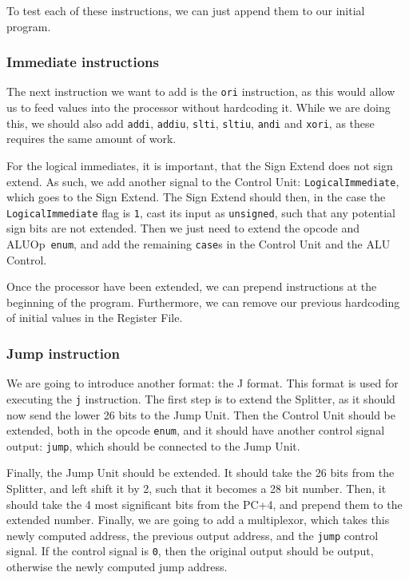 To test each of these instructions, we can just append them to our initial
program.

\subsubsection*{Immediate instructions}
The next instruction we want to add is the \texttt{ori} instruction, as this
would allow us to feed values into the processor without hardcoding it. While
we are doing this, we should also add \texttt{addi}, \texttt{addiu},
\texttt{slti}, \texttt{sltiu}, \texttt{andi} and \texttt{xori}, as these
requires the same amount of work.

For the logical immediates, it is important, that the Sign Extend does not
sign extend. As such, we add another signal to the Control Unit:
\texttt{LogicalImmediate}, which goes to the Sign Extend. The Sign Extend
should then, in the case the \texttt{LogicalImmediate} flag is \texttt{1}, cast
its input as \texttt{unsigned}, such that any potential sign bits are not
extended. Then we just need to extend the opcode and ALUOp \texttt{enum}, and
add the remaining \texttt{case}s in the Control Unit and the ALU Control.

Once the processor have been extended, we can prepend instructions at the
beginning of the program. Furthermore, we can remove our previous hardcoding of
initial values in the Register File.

\subsubsection*{Jump instruction}
We are going to introduce another format: the J format. This format is used for
executing the \texttt{j} instruction. The first step is to extend the Splitter,
as it should now send the lower 26 bits to the Jump Unit. Then the Control Unit
should be extended, both in the opcode \texttt{enum}, and it should have another
control signal output: \texttt{jump}, which should be connected to the Jump
Unit.

Finally, the Jump Unit should be extended. It should take the 26 bits from the
Splitter, and left shift it by 2, such that it becomes a 28 bit number. Then,
it should take the 4 most significant bits from the PC+4, and prepend them to
the extended number.  Finally, we are going to add a multiplexor, which takes
this newly computed address, the previous output address, and the \texttt{jump}
control signal. If the control signal is \texttt{0}, then the original output
should be output, otherwise the newly computed jump address.

